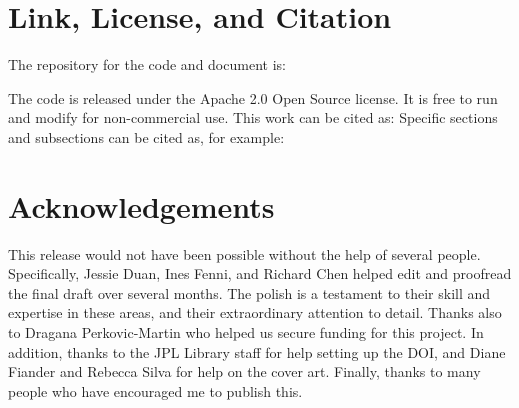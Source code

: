 \clearpage
\newpage

\section{Link, License, and Citation}
\vspace{-2mm}
The repository for the code and document is:
\newline
\newline
\begin{centering}
\end{centering}
\newline
\newline
The code is released under the Apache 2.0 Open Source license. It is free to run and modify for non-commercial use. 
\vspace{-2mm}
\newline
\newline
This work can be cited as:
\vspace{-2mm}
\newline
\newline
\noindent
{}
\newline
\newline
\vspace{-2mm}
\newline
\vspace{-2mm}
Specific sections and subsections can be cited as, for example:
\newline
\newline
\noindent
{}

\vspace{-2mm}
\section{Acknowledgements}
\vspace{-2mm}
This release would not have been possible without the help of several people. Specifically, Jessie Duan, Ines Fenni, and Richard Chen helped edit and proofread the final draft over several months. The polish is a testament to their skill and expertise in these areas, and their extraordinary attention to detail. Thanks also to Dragana Perkovic-Martin who helped us secure funding for this project. In addition, thanks to the JPL Library staff for help setting up the DOI, and Diane Fiander and Rebecca Silva for help on the cover art. Finally, thanks to many people who have encouraged me to publish this. 

